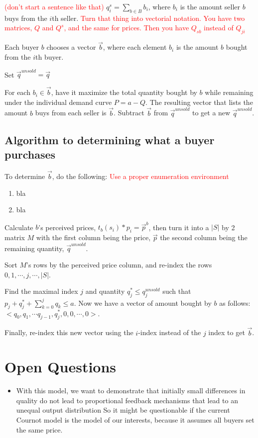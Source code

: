 \documentclass[11pt]{article}
\newcommand{\red}[1]{\textcolor{red}{#1}} %
\begin{document}
\red{(don't start a sentence like that)}
$q^s_i = \sum _{b\in B} b_i$, where $b_i$ is the amount seller $b$ buys from the
$i$th seller.  
\red{Turn that thing into vectorial notation. You have two matrices, $Q$ and $Q^s$, and the same for prices. Then you have $Q_{sb}$ instead of $Q_{ji}$}

Each buyer $b$ chooses a vector $\vec{b}$, where each element
$b_i$ is the amount $b$ bought from the $i$th buyer.  

Set $\vec{q}^{unsold} = \vec{q}$

For each $b_i \in \vec{b}$, have it maximize the total quantity bought by $b$
while remaining under the individual demand curve $P=a-Q$.  The resulting vector
that lists the amount $b$ buys from each seller is $\vec{b}$.  Subtract
$\vec{b}$ from $\vec{q}^{unsold}$ to get a new $\vec{q}^{unsold}$.

\subsection{Algorithm to determining what a buyer purchases}
To determine $\vec{b}$, do the following:
\red{Use a proper enumeration environment}

\begin{enumerate}
	\item bla 
	\item bla 
\end{enumerate}

Calculate $b$'s perceived prices, $t_b(s_i) * p_i = \vec{p}^b$, then turn it
into a $|S|$ by 2 matrix $M$ with the first column being the price, $\vec{p}$
the second column being the remaining quantity, $\vec{q}^{unsold}$. 

Sort $M$'s rows by the perceived price column, and re-index the rows\newline $0,
1, \cdots , j, \cdots , |S|$. 

Find the maximal index $j$ and quantity $q^{*}_j \le q^{unsold}_j$ such that
$p_j + q^{*}_j + \sum_{k=0}^j q_k \le a$.  Now we have a vector of amount bought
by $b$ as follows: $<q_0, q_1,\cdots q_{j-1}, q^{*}_j, 0, 0, \cdots, 0>.$

Finally, re-index this new vector using the $i$-index instead of the $j$ index
to get $\vec{b}$.

\section{Open Questions}

\begin{itemize}

	\item With this model, we want to demonstrate that initially small differences in quality do not lead to proportional feedback
		mechanisms that lead to an unequal output distribution
		So it might be questionable if the current Cournot model is the model of our interests, 
		because it assumes all buyers set the same price. 

\end{itemize}
\end{document}
